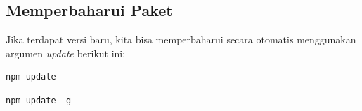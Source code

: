 \subsection{Memperbaharui Paket}

Jika terdapat versi baru, kita bisa memperbaharui secara otomatis menggunakan argumen \textit{update} berikut ini:

\lstset{language=bash,caption=Memperbaharui paket lokal}
\begin{lstlisting}
npm update
\end{lstlisting}

\lstset{language=bash, caption=Memperbaharui paket secara global}
\begin{lstlisting}
npm update -g
\end{lstlisting}
